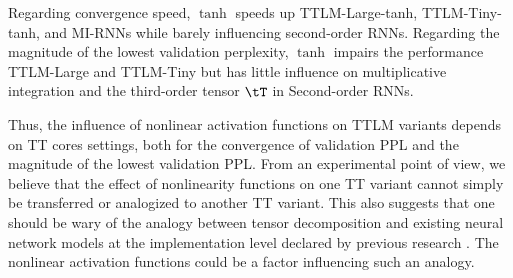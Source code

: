 Regarding convergence speed, $\tanh$ speeds up TTLM-Large-tanh, TTLM-Tiny-tanh, and MI-RNNs while barely influencing second-order RNNs. Regarding the magnitude of the lowest validation perplexity,  $\tanh$ impairs the performance  TTLM-Large and TTLM-Tiny but has little influence on multiplicative integration and the third-order tensor $\tT$ in Second-order RNNs.  

Thus, the influence of nonlinear activation functions on TTLM variants depends on TT cores settings, both for the convergence of validation PPL and the magnitude of the lowest validation PPL.  From an experimental point of view, we believe that the effect of nonlinearity functions on one TT variant cannot simply be transferred or analogized to another TT variant. This also suggests that one should be wary of the analogy between tensor decomposition and existing neural network models at the implementation level declared by previous research \citep{khrulkov2018expressive, levine2018benefits}. The nonlinear activation functions could be a factor influencing such an analogy.


